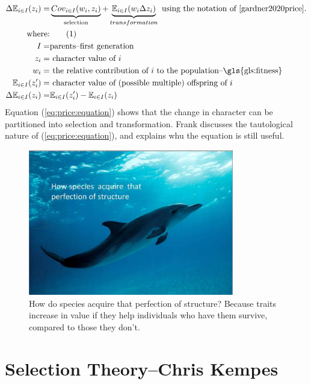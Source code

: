 \documentclass[]{article}
\newcommand\numberthis{\addtocounter{equation}{1}\tag{\theequation}}
\begin{document}
\begin{align*}
	\Delta \mathbb{E}_{i\in I}(z_i) =& \underbrace{Cov_{i\in I}(w_i,z_i)}_\text{selection} + \underbrace{\mathbb{E}_{i\in I}(w_i \Delta z_i)}_{transformation} \text{ using the notation of \cite{gardner2020price}.}\\
	\text{where:}& \numberthis \label{eq:price:equation}\\
	I =& \text{parents--first generation}\\
	z_i =& \text{ character value of $i$}\\
	w_i =& \text{ the relative contribution of $i$ to the population--\gls{gls:fitness}}\\
	\mathbb{E}_{i\in I}(z^\prime_i)=& \text{ character value of (possible multiple) offspring of $i$}\\
	\Delta \mathbb{E}_{i\in I}(z_i)=& \mathbb{E}_{i\in I}(z^\prime_i)-\mathbb{E}_{i\in I}(z_i)
\end{align*}
 Equation (\ref{eq:price:equation}) shows that the change in character can be partitioned into selection and transformation. Frank \cite{frank2012natural} discusses the tautological nature of (\ref{eq:price:equation}), and explains whu the equation is still useful.
 
\begin{figure}[H]
	\begin{center}
		\caption[How do species acquire that perfection of structure? ]{How do species acquire that perfection of structure? Because traits increase in value if they help individuals who have them survive, compared to those they don't.}
		\includegraphics[width=0.8\textwidth]{dolphin}
	\end{center}
\end{figure}


\section[Selection Theory]{Selection Theory--Chris Kempes}
\end{document}
